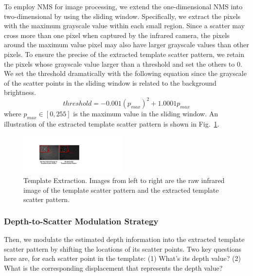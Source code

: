 To employ NMS for image processing, we extend the one-dimensional NMS into two-dimensional by using the sliding window. Specifically, we extract the pixels with the maximum grayscale value within each small region.
Since a scatter may cross more than one pixel when captured by the infrared camera, the pixels around the maximum value pixel may also have  larger grayscale values than other pixels. 
To ensure the precise of the extracted template scatter pattern, we retain the pixels whose grayscale value larger than a threshold and set the others to 0. We set the threshold dramatically with the following equation since the grayscale of the scatter points in the sliding window is related to the background brightness.
\begin{equation}
	threshold = -0.001(p_{max})^2 + 1.0001 p_{max}\label{nms_2}
\end{equation}
where $p_{max} \in \left [ 0, 255 \right ]$ is the maximum value in the sliding window. An illustration of the extracted template scatter pattern is shown in Fig.~\ref{template_extraction}.


\begin{figure}[!t]
	\centering
	\includegraphics[width=0.48\textwidth]{figures/template_extraction.pdf} 
	\vspace{-0.15in}
	\caption{Template Extraction. Images from left to right are the raw infrared image of the template scatter pattern and the extracted template scatter pattern.}
	\label{template_extraction}
	\vspace{-0.15in}
\end{figure}


\subsubsection{Depth-to-Scatter Modulation Strategy}
Then, we modulate the estimated depth information into the extracted template scatter pattern by shifting the locations of its scatter points. 
Two key questions here are, for each scatter point in the template: (1) What's its depth value? (2) What is  the corresponding displacement that represents the depth value?

